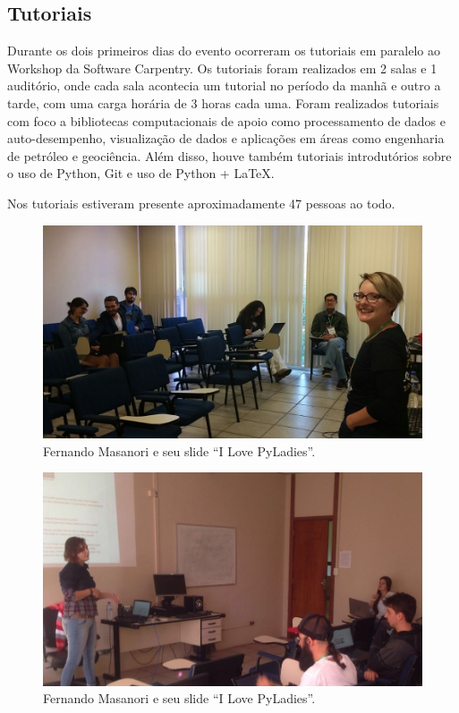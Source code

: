 \documentclass[12pt]{article}
\begin{document}
\subsection*{Tutoriais}

Durante os dois primeiros dias do evento ocorreram os tutoriais em paralelo ao Workshop da Software Carpentry. Os tutoriais foram realizados em 2 salas e 1 auditório, onde cada sala acontecia um tutorial no período da manhã e outro a tarde, com uma carga horária de 3 horas cada uma. Foram realizados tutoriais com foco a bibliotecas computacionais de apoio como processamento de dados e auto-desempenho, visualização de dados e aplicações em áreas como engenharia de petróleo e geociência. Além disso, houve também tutoriais introdutórios sobre o uso de Python, Git e uso de Python + LaTeX.

Nos tutoriais estiveram presente aproximadamente 47 pessoas ao todo. 

\noindent  %
\begin{figure}[!htb]
\center
\includegraphics[height=.3\textheight]{tutorial-latex.jpg}
\caption{Fernando Masanori e seu slide ``I Love PyLadies''.}
\end{figure}

\noindent  %
\begin{figure}[!htb]
\center
\includegraphics[height=.3\textheight]{tutorial-pyopencl.jpg}
\caption{Fernando Masanori e seu slide ``I Love PyLadies''.}
\end{figure}
\end{document}
